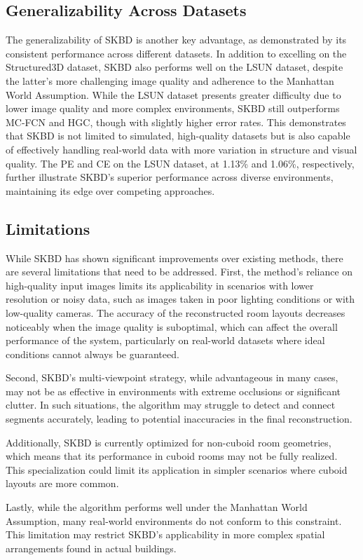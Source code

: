 \subsection{Generalizability Across Datasets}
The generalizability of SKBD is another key advantage, as demonstrated by its consistent performance across different datasets. In addition to excelling on the Structured3D dataset, SKBD also performs well on the LSUN dataset, despite the latter’s more challenging image quality and adherence to the Manhattan World Assumption. While the LSUN dataset presents greater difficulty due to lower image quality and more complex environments, SKBD still outperforms MC-FCN and HGC, though with slightly higher error rates. This demonstrates that SKBD is not limited to simulated, high-quality datasets but is also capable of effectively handling real-world data with more variation in structure and visual quality. The PE and CE on the LSUN dataset, at 1.13\% and 1.06\%, respectively, further illustrate SKBD’s superior performance across diverse environments, maintaining its edge over competing approaches.

\subsection{Limitations}
While SKBD has shown significant improvements over existing methods, there are several limitations that need to be addressed. First, the method’s reliance on high-quality input images limits its applicability in scenarios with lower resolution or noisy data, such as images taken in poor lighting conditions or with low-quality cameras. The accuracy of the reconstructed room layouts decreases noticeably when the image quality is suboptimal, which can affect the overall performance of the system, particularly on real-world datasets where ideal conditions cannot always be guaranteed.

Second, SKBD's multi-viewpoint strategy, while advantageous in many cases, may not be as effective in environments with extreme occlusions or significant clutter. In such situations, the algorithm may struggle to detect and connect segments accurately, leading to potential inaccuracies in the final reconstruction. 

Additionally, SKBD is currently optimized for non-cuboid room geometries, which means that its performance in cuboid rooms may not be fully realized. This specialization could limit its application in simpler scenarios where cuboid layouts are more common.

Lastly, while the algorithm performs well under the Manhattan World Assumption, many real-world environments do not conform to this constraint. This limitation may restrict SKBD's applicability in more complex spatial arrangements found in actual buildings.
